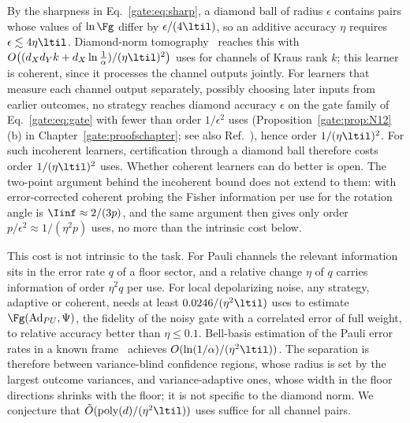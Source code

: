 By the sharpness in Eq.~\eqref{gate:eq:sharp}, a diamond ball of radius $\epsilon$ contains pairs whose values of $\ln\Fg$ differ by $\epsilon/(4\ltil)$, so an additive accuracy $\eta$ requires $\epsilon\lesssim4\eta\ltil$. Diamond-norm tomography~\cite{MeleBittel2025} reaches this with $O\big((d_Xd_Yk+d_X\ln\frac1{\alpha})/(\eta\ltil)^2\big)$ uses for channels of Kraus rank $k$; this learner is coherent, since it processes the channel outputs jointly. For learners that measure each channel output separately, possibly choosing later inputs from earlier outcomes, no strategy reaches diamond accuracy $\epsilon$ on the gate family of Eq.~\eqref{gate:eq:gate} with fewer than order $1/\epsilon^2$ uses (Proposition~\ref{gate:prop:N12}(b) in Chapter~\ref{gate:proofschapter}; see also Ref.~\cite{OufkirGirardi2026}), hence order $1/(\eta\ltil)^2$. For such incoherent learners, certification through a diamond ball therefore costs order $1/(\eta\ltil)^2$ uses. Whether coherent learners can do better is open. The two-point argument behind the incoherent bound does not extend to them: with error-corrected coherent probing the Fisher information per use for the rotation angle is $\Iinf\approx2/(3p)$, and the same argument then gives only order $p/\epsilon^2\approx1/(\eta^2p)$ uses, no more than the intrinsic cost below.

This cost is not intrinsic to the task. For Pauli channels the relevant information sits in the error rate $q$ of a floor sector, and a relative change $\eta$ of $q$ carries information of order $\eta^2q$ per use. For local depolarizing noise, any strategy, adaptive or coherent, needs at least $0.0246/(\eta^2\ltil)$ uses to estimate $\Fg(\mathrm{Ad}_{PU},\Psi)$, the fidelity of the noisy gate with a correlated error of full weight, to relative accuracy better than $\eta\le0.1$. Bell-basis estimation of the Pauli error rates in a known frame~\cite{FlammiaWallman2020,HarperFlammiaWallman2020} achieves $O(\ln(1/\alpha)/(\eta^2\ltil))$. The separation is therefore between variance-blind confidence regions, whose radius is set by the largest outcome variances, and variance-adaptive ones, whose width in the floor directions shrinks with the floor; it is not specific to the diamond norm. We conjecture that $\tilde O(\mathrm{poly}(d)/(\eta^2\ltil))$ uses suffice for all channel pairs.

